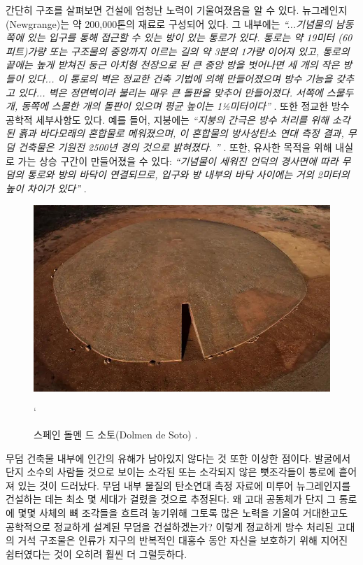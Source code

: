 \documentclass[10pt,twocolumn,letterpaper]{article}
\begin{document}
간단히 구조를 살펴보면 건설에 엄청난 노력이 기울여졌음을 알 수 있다. 뉴그레인지(Newgrange)는 약 200,000톤의 재료로 구성되어 있다. 그 내부에는 \textit{“...기념물의 남동쪽에 있는 입구를 통해 접근할 수 있는 방이 있는 통로가 있다. 통로는 약 19미터 (60피트)가량 또는 구조물의 중앙까지 이르는 길의 약 3분의 1가량 이어져 있고, 통로의 끝에는 높게 받쳐진 둥근 아치형 천장으로 된 큰 중앙 방을 벗어나면 세 개의 작은 방들이 있다... 이 통로의 벽은 정교한 건축 기법에 의해 만들어졌으며 방수 기능을 갖추고 있다... 벽은 정면벽이라 불리는 매우 큰 돌판을 맞추어 만들어졌다. 서쪽에 스물두 개, 동쪽에 스물한 개의 돌판이 있으며 평균 높이는 1½미터이다”} \cite{70}. 또한 정교한 방수 공학적 세부사항도 있다. 예를 들어, 지붕에는 \textit{“지붕의 간극은 방수 처리를 위해 소각된 흙과 바다모래의 혼합물로 메워졌으며, 이 혼합물의 방사성탄소 연대 측정 결과, 무덤 건축물은 기원전 2500년 경의 것으로 밝혀졌다. ”} \cite{71}. 또한, 유사한 목적을 위해 내실로 가는 상승 구간이 만들어졌을 수 있다: \textit{“기념물이 세워진 언덕의 경사면에 따라 무덤의 통로와 방의 바닥이 연결되므로, 입구와 방 내부의 바닥 사이에는 거의 2미터의 높이 차이가 있다”} \cite{71}.

\begin{figure}[t]
\begin{center}
   \includegraphics[width=1\linewidth]{dolmen.jpg}
\end{center}
   \caption{스페인 돌멘 드 소토(Dolmen de Soto) \cite{53}.}`
\label{fig:9}
\label{fig:onecol}
\end{figure}

무덤 건축물 내부에 인간의 유해가 남아있지 않다는 것 또한 이상한 점이다. 발굴에서 단지 소수의 사람들 것으로 보이는 소각된 또는 소각되지 않은 뼛조각들이 통로에 흩어져 있는 것이 드러났다. 무덤 내부 물질의 탄소연대 측정 자료에 미루어 뉴그레인지를 건설하는 데는 최소 몇 세대가 걸렸을 것으로 추정된다. 왜 고대 공동체가 단지 그 통로에 몇몇 사체의 뼈 조각들을 흐트려 놓기위해  그토록 많은 노력을 기울여 거대한고도 공학적으로 정교하게 설계된 무덤을 건설하겠는가? 이렇게 정교하게 방수 처리된 고대의 거석 구조물은 인류가 지구의 반복적인 대홍수 동안 자신을 보호하기 위해 지어진 쉼터였다는 것이 오히려 훨씬 더 그럴듯하다.
\end{document}
